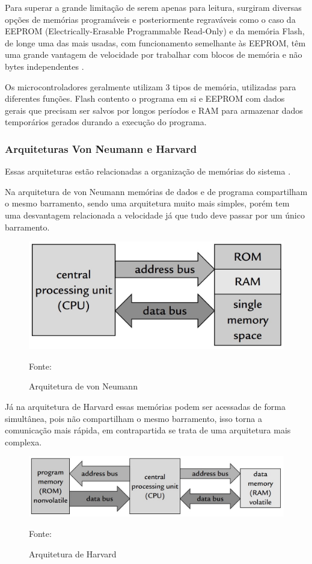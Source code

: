 Para superar a grande limitação de serem apenas para leitura, surgiram diversas opções de memórias programáveis e posteriormente regraváveis como o caso da EEPROM (Electrically-Erasable Programmable Read-Only) e da memória Flash, de longe uma das mais usadas, com funcionamento semelhante às EEPROM, têm uma grande vantagem de velocidade por trabalhar com blocos de memória e não bytes independentes \cite{harari1994flash}.

Os microcontroladores geralmente utilizam 3 tipos de memória, utilizadas para diferentes funções. Flash contento o programa em si e EEPROM com dados gerais que precisam ser salvos por longos períodos e RAM para armazenar dados temporários gerados durando a execução do programa.

\subsubsection*{Arquiteturas Von Neumann e Harvard}

Essas arquiteturas estão relacionadas a organização de memórias do sistema \cite{MeloDeOliveira2014}.

Na arquitetura de von Neumann memórias de dados e de programa compartilham o mesmo barramento, sendo uma arquitetura muito mais simples, porém tem uma desvantagem relacionada a velocidade já que tudo deve passar por um único barramento.

\begin{figure}[h!]
  \centering
  \includegraphics[width=0.5\linewidth]{figuras/vonNeumann.jpg}
  \caption{Arquitetura de von Neumann} Fonte: \cite{Basics2008}
  \label{fig:vanneumann}
\end{figure}

Já na arquitetura de Harvard essas memórias podem ser acessadas de forma simultânea, pois não compartilham o mesmo barramento, isso torna a comunicação mais rápida, em contrapartida se trata de uma arquitetura mais complexa.

\begin{figure}[h!]
  \centering
  \includegraphics[width=0.8\linewidth]{figuras/harvard.jpg}
  \caption{Arquitetura de Harvard} Fonte: \cite{Basics2008}
  \label{fig:harvard}
\end{figure}

